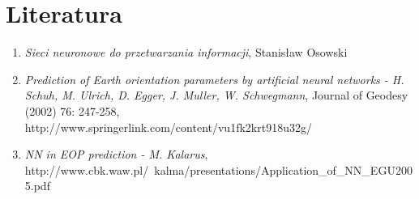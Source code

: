 \documentclass[12pt,a4]{article}
\begin{document}
\section{Literatura}
\begin{enumerate}
\item \emph{Sieci neuronowe do przetwarzania informacji}, Stanisław Osowski
\item \emph{Prediction of Earth orientation parameters by artificial neural networks - H. Schuh, M. Ulrich, D. Egger, J. Muller, W. Schwegmann}, Journal of Geodesy (2002) 76: 247-258,\\http://www.springerlink.com/content/vu1fk2krt918u32g/
\item \emph{NN in EOP prediction - M. Kalarus}, http://www.cbk.waw.pl/~kalma/presentations/Application\_of\_NN\_EGU2005.pdf
\end{enumerate}
\end{document}
